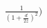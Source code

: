 \documentclass[preview]{standalone}
\begin{document}
\begin{align*}
\frac{1}{(1 + \frac{d}{2z})^{2}}\big)
\end{align*}
\end{document}
